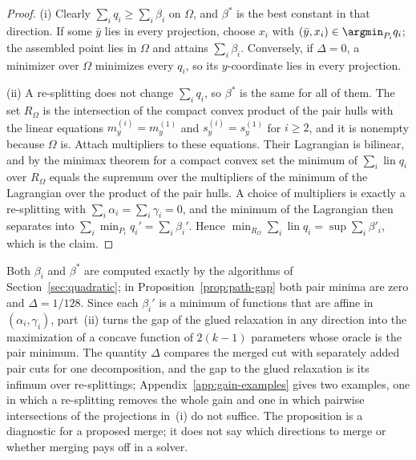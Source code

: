 \begin{proof}
(i) Clearly $\sum_iq_i\ge\sum_i\beta_i$ on $\Omega$, and $\beta^\ast$ is the
best constant in that direction. If some $\bar y$ lies in every projection,
choose $x_i$ with $(\bar y,x_i)\in\argmin_{P_i}q_i$; the assembled point lies
in $\Omega$ and attains $\sum_i\beta_i$. Conversely, if $\Delta=0$, a minimizer
over $\Omega$ minimizes every $q_i$, so its $y$-coordinate lies in every
projection.

(ii) A re-splitting does not change $\sum_iq_i$, so $\beta^\ast$ is the same for
all of them. The set $R_\Omega$ is the intersection of the compact convex
product of the pair hulls with the linear equations
$m_y^{(i)}=m_y^{(1)}$ and $s_y^{(i)}=s_y^{(1)}$ for $i\ge2$, and it is
nonempty because $\Omega$ is. Attach multipliers to these equations. Their
Lagrangian is bilinear, and by the minimax theorem for a compact convex
set \citep{Sion1958} the minimum of $\sum_i\operatorname{lin}q_i$ over
$R_\Omega$ equals the supremum over the multipliers of the minimum of the
Lagrangian over the product of the pair hulls. A choice of multipliers is
exactly a re-splitting with $\sum_i\alpha_i=\sum_i\gamma_i=0$, and the minimum
of the Lagrangian then separates into $\sum_i\min_{P_i}q_i'=\sum_i\beta_i'$.
Hence $\min_{R_\Omega}\sum_i\operatorname{lin}q_i=\sup\sum_i\beta'_i$, which is
the claim.
\end{proof}

Both $\beta_i$ and $\beta^\ast$ are computed exactly by the algorithms of
Section~\ref{sec:quadratic}; in Proposition~\ref{prop:path-gap} both pair
minima are zero and $\Delta=1/128$. Since each $\beta_i'$ is a minimum of
functions that are affine in $(\alpha_i,\gamma_i)$, part~(ii) turns the gap of
the glued relaxation in any direction into the maximization of a concave
function of $2(k-1)$ parameters whose oracle is the pair minimum. The quantity $\Delta$ compares the merged
cut with separately added pair cuts for one decomposition, and the gap to
the glued relaxation is its infimum over re-splittings;
Appendix~\ref{app:gain-examples} gives two examples, one in which a
re-splitting removes the whole gain and one in which pairwise intersections of
the projections in~(i) do not suffice. The proposition is a diagnostic
for a proposed merge; it does not say which directions to merge or whether
merging pays off in a solver.
